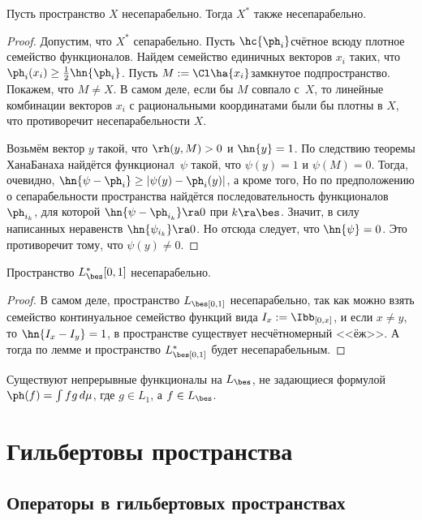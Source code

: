 \documentclass[a4paper]{article}
\begin{document}
\begin{lemma}
Пусть пространство $X$ несепарабельно. Тогда $X^*$ также несепарабельно.
\end{lemma}
\begin{proof}
Допустим, что $X^*$ сепарабельно. Пусть $\hc{\ph_i}$\т счётное всюду плотное семейство функционалов. Найдем семейство
единичных векторов $x_i$ таких, что $\ph_i(x_i) \ge \frac12\hn{\ph_i}$.
Пусть $M := \Cl \ha{x_i}$\т замкнутое подпространство. Покажем, что $M \neq X$. В самом деле, если бы
$M$ совпало с~$X$, то линейные комбинации векторов $x_i$ с рациональными координатами были бы плотны в $X$,
что противоречит несепарабельности $X$.

Возьмём вектор $y$ такой, что $\rh(y, M) > 0$ и $\hn{y}=1$.
По следствию теоремы Хана\ч Банаха найдётся функционал~$\psi$ такой, что $\psi(y)=1$ и $\psi(M)=0$.
Тогда, очевидно, $\hn{\psi - \ph_i} \ge |\psi(y)-\ph_i(y)|$, а кроме того,
Но по предположению о сепарабельности пространства найдётся последовательность функционалов $\ph_{i_k}$, для которой ${\hn{\psi - \ph_{i_k}}\ra 0}$
при $k\ra\bes$. Значит, в силу написанных неравенств $\hn{\psi_{i_k}}\ra 0$. Но отсюда следует, что
$\hn{\psi}=0$. Это противоречит тому, что $\psi(y)\neq 0$.
\end{proof}

\begin{theorem}
Пространство $L_\bes^*[0,1]$ несепарабельно.
\end{theorem}
\begin{proof}
В самом деле, пространство $L_\bes[0,1]$ несепарабельно, так как можно взять семейство континуальное семейство
функций вида $I_x:= \Ibb_{[0,x]}$, и если $x\neq y$, то $\hn{I_x-I_y} = 1$,  в пространстве существует
несчётномерный <<ёж>>. А тогда по лемме и пространство $L^*_\bes[0,1]$ будет несепарабельным.
\end{proof}
\begin{imp}
Существуют непрерывные функционалы на $L_\bes$, не задающиеся формулой $\ph(f) = \int fg\,d\mu$, где $g\in L_1$, а $f\in L_\bes$.
\end{imp}

\section{Гильбертовы пространства}

\subsection{Операторы в гильбертовых пространствах}
\end{document}
